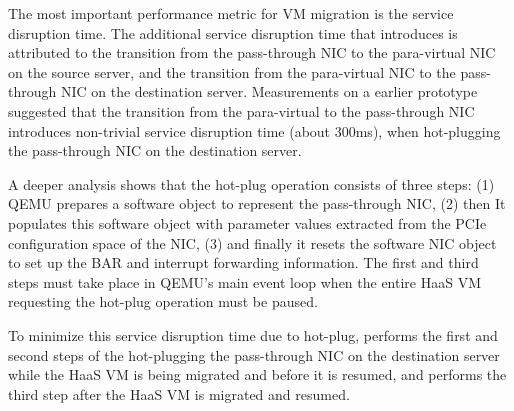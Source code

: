The most important performance metric for VM migration is the service disruption time.
The additional service disruption time that \na introduces is attributed to the transition from
the pass-through NIC to the para-virtual NIC on the source server, and the transition from
the para-virtual NIC to the pass-through NIC on the destination server.
Measurements on a earlier \na prototype suggested that the transition from the 
para-virtual to the pass-through NIC introduces non-trivial service disruption time (about 300ms), 
when hot-plugging the pass-through NIC on the destination server. 

A deeper analysis shows that the hot-plug operation consists of three steps:
(1) QEMU prepares a software object to represent the pass-through
NIC, (2) then It populates this software object with parameter values extracted 
from the PCIe configuration space of the NIC, (3) and finally it
resets the software NIC object to set up the BAR and interrupt forwarding
information. The first and third steps must take place in QEMU's main event
loop when the entire HaaS VM requesting the hot-plug operation must be paused.

To minimize this service disruption time due to hot-plug, 
\na performs the first and second steps of the hot-plugging the pass-through NIC
on the destination server while the HaaS VM is being migrated and before it is resumed, 
and performs the third step after the HaaS VM is migrated and resumed. 


